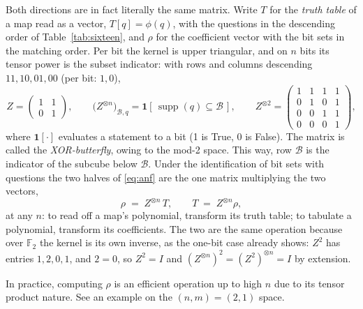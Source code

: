 \documentclass[11pt]{article}
\begin{document}
Both directions are in fact literally the same matrix. Write $T$ for the
\emph{truth table} of a map read as a vector, $T[q] = \phi(q)$, with
the questions in the descending order of Table~\ref{tab:sixteen}, and
$\rho$ for the coefficient vector with the bit sets in the matching
order. Per bit the kernel is upper triangular, and on $n$ bits its
tensor power is the subset indicator: with rows and columns descending
$11, 10, 01, 00$ (per bit: $1, 0$),
%
\begin{equation}
  Z = \begin{pmatrix} 1 & 1 \\ 0 & 1 \end{pmatrix},
  \qquad
  \big(Z^{\otimes n}\big)_{\mathcal B, q}
    = \mathbf 1[\, \operatorname{supp}(q) \subseteq \mathcal B \,],
  \qquad
  Z^{\otimes 2} =
  \begin{pmatrix}
    1 & 1 & 1 & 1 \\
    0 & 1 & 0 & 1 \\
    0 & 0 & 1 & 1 \\
    0 & 0 & 0 & 1
  \end{pmatrix},
  \label{eq:zkernel}
\end{equation}
%
where $\mathbf 1[\cdot]$ evaluates a statement to a bit (1 is True, 0 is False). 
The matrix is called the \emph{XOR-butterfly}, owing to the mod-2 space.
This way, row
$\mathcal B$ is the indicator of the subcube below $\mathcal B$. Under
the identification of bit sets with questions the two halves of
\eqref{eq:anf} are the one matrix multiplying the two vectors,
%
\begin{equation}
  \rho \;=\; Z^{\otimes n} \, T,
  \qquad
  T \;=\; Z^{\otimes n} \rho ,
  \label{eq:zpair}
\end{equation}
%
at any $n$: to read off a map's polynomial, transform its truth table;
to tabulate a polynomial, transform its coefficients. The two are the
same operation because over $\mathbb F_2$ the kernel is its own
inverse, as the one-bit case already shows: $Z^2$ has entries
$1, 2, 0, 1$, and $2 = 0$, so $Z^2 = I$ and
$(Z^{\otimes n})^2 = (Z^2)^{\otimes n} = I$ by extension.

In practice, computing $\rho$ is an efficient operation up to high $n$ due to its tensor product nature. See an example
on the $(n,m)=(2,1)$ space.
\end{document}
